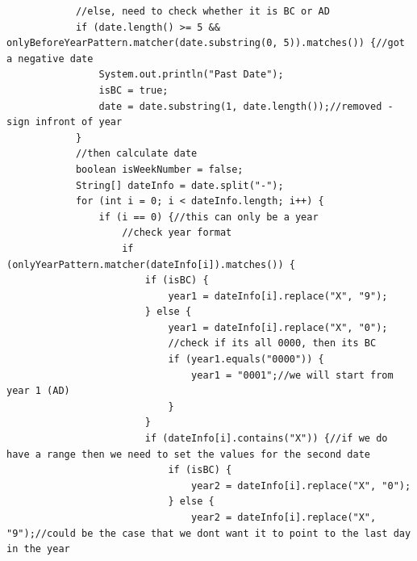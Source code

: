 \begin{lstlisting}
            //else, need to check whether it is BC or AD
            if (date.length() >= 5 && onlyBeforeYearPattern.matcher(date.substring(0, 5)).matches()) {//got a negative date
                System.out.println("Past Date");
                isBC = true;
                date = date.substring(1, date.length());//removed - sign infront of year
            }
            //then calculate date
            boolean isWeekNumber = false;
            String[] dateInfo = date.split("-");
            for (int i = 0; i < dateInfo.length; i++) {
                if (i == 0) {//this can only be a year
                    //check year format
                    if (onlyYearPattern.matcher(dateInfo[i]).matches()) {
                        if (isBC) {
                            year1 = dateInfo[i].replace("X", "9");
                        } else {
                            year1 = dateInfo[i].replace("X", "0");
                            //check if its all 0000, then its BC
                            if (year1.equals("0000")) {
                                year1 = "0001";//we will start from year 1 (AD)
                            }
                        }
                        if (dateInfo[i].contains("X")) {//if we do have a range then we need to set the values for the second date
                            if (isBC) {
                                year2 = dateInfo[i].replace("X", "0");
                            } else {
                                year2 = dateInfo[i].replace("X", "9");//could be the case that we dont want it to point to the last day in the year


\end{lstlisting}
